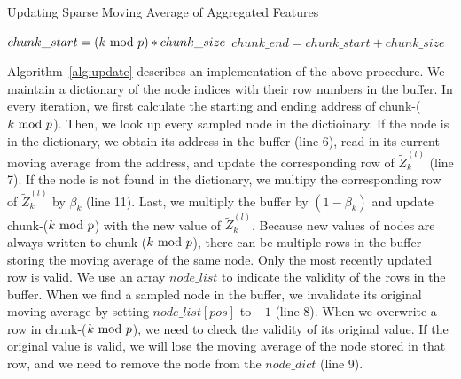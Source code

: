 \begin{algorithm}[t]
  \small
  \caption{Updating Sparse Moving Average of Aggregated Features}
  \label{alg:update}
  $chunk\_start=(k\ \mathrm{mod}\ p) * chunk\_size$\;
  $chunk\_end=chunk\_start + chunk\_size$\;
  \end{algorithm}

Algorithm~\ref{alg:update} describes an implementation of the above procedure. 
We maintain a dictionary of the node indices with their row numbers in the buffer. 
In every iteration, we first calculate the starting and ending address of chunk-($k\ \mathrm{mod}\ p$). 
Then, we look up every sampled node in the dictioinary. 
If the node is in the dictionary, we obtain its address in the buffer (line 6), read in its current moving average from the address, and update the corresponding row of $\widetilde{Z}_k^{(l)}$ (line 7). 
If the node is not found in the dictionary, we multipy the corresponding row of $\widetilde{Z}_k^{(l)}$ by $\beta_k$ (line 11). 
Last, we multiply the buffer by $(1-\beta_k)$ and update chunk-($k\ \mathrm{mod}\ p$) with the new value of $\widetilde{Z}_k^{(l)}$.  
Because new values of nodes are always written to chunk-($k\ \mathrm{mod}\ p$), there can be multiple rows in the buffer storing the moving average of the same node. 
Only the most recently updated row is valid. 
We use an array $node\_list$ to indicate the validity of the rows in the buffer. 
When we find a sampled node in the buffer, we invalidate its original moving average by setting $node\_list[pos]$ to $-1$ (line 8). 
When we overwrite a row in chunk-($k\ \mathrm{mod}\ p$), we need to check the validity of its original value. 
If the original value is valid, we will lose the moving average of the node stored in that row, and we need to remove the node from the $node\_dict$ (line 9). 


